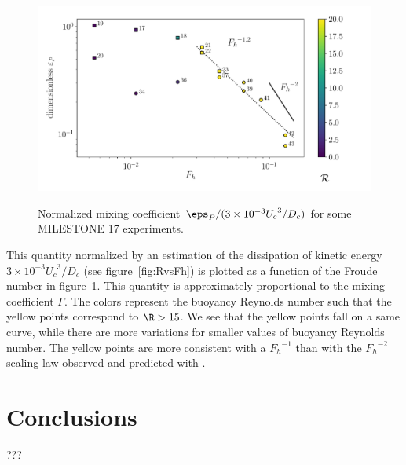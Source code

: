 \begin{figure}
\includegraphics[width=\figwidth]{tmp/fig_dt_pot_energy}
\label{fig:dt:pot:energy}

\caption{Normalized mixing coefficient $\eps_P / (3\times10^{-3} {U_c}^3/D_c)$
for some MILESTONE 17 experiments.}

\end{figure}

This quantity normalized by an estimation of the dissipation of kinetic energy
$3\times10^{-3} {U_c}^3/D_c$ (see figure~\ref{fig:RvsFh}) is plotted as a
function of the Froude number in figure~\ref{fig:dt:pot:energy}. This quantity
is approximately proportional to the mixing coefficient $\Gamma$. The colors
represent the buoyancy Reynolds number such that the yellow points correspond
to $\R > 15$. We see that the yellow points fall on a same curve, while there
are more variations for smaller values of buoyancy Reynolds number. The yellow
points are more consistent with a ${F_h}^{-1}$ than with the ${F_h}^{-2}$
scaling law observed and predicted with \cite{Maffioli2016}.

\section{Conclusions}

???
